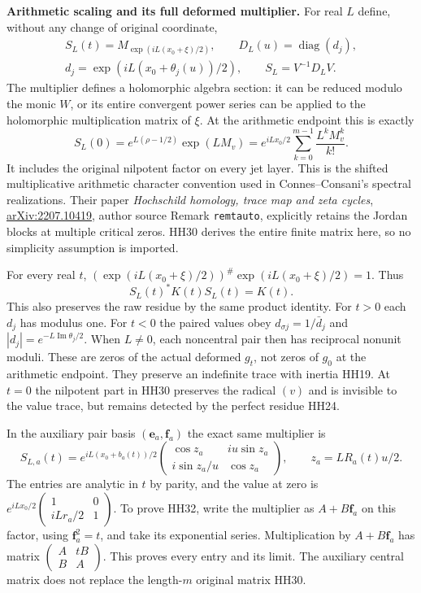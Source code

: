 \HH\textbf{Arithmetic scaling and its full deformed multiplier.}
For real $L$ define, without any change of original coordinate,
\[
 \begin{gathered}
 S_L(t)=M_{\exp(iL(x_0+\xi)/2)},\qquad
 D_L(u)=\operatorname{diag}(d_j),\\
 d_j=\exp(iL(x_0+\theta_j(u))/2),\qquad
 S_L=V^{-1}D_LV .
 \end{gathered}
 \tag{HH29}\label{hh:scaling}
\]
The multiplier defines a holomorphic algebra section: it can be
reduced modulo the monic $W$, or its entire convergent power series
can be applied to the holomorphic multiplication matrix of $\xi$.
At the arithmetic endpoint this is exactly
\[
 S_L(0)=e^{L(\rho-1/2)}\exp(LM_v)
  =e^{iLx_0/2}\sum_{k=0}^{m-1}\frac{L^kM_v^k}{k!}.
 \tag{HH30}\label{hh:arithmetic-scaling}
\]
It includes the original nilpotent factor on every jet layer.
This is the shifted multiplicative arithmetic character convention
used in Connes--Consani's spectral realizations. Their paper
\emph{Hochschild homology, trace map and zeta cycles},
\href{https://arxiv.org/abs/2207.10419}{arXiv:2207.10419},
author source Remark \texttt{remtauto}, explicitly retains the
Jordan blocks at multiple critical zeros. HH30 derives the entire
finite matrix here, so no simplicity assumption is imported.

For every real $t$, $(\exp(iL(x_0+\xi)/2))^\#
\exp(iL(x_0+\xi)/2)=1$. Thus
\[
 S_L(t)^*K(t)S_L(t)=K(t).
 \tag{HH31}\label{hh:scaling-isometry}
\]
This also preserves the raw residue by the same product identity.
For $t>0$ each $d_j$ has modulus one.
For $t<0$ the paired values obey
$d_{\sigma j}=1/\bar d_j$ and
$|d_j|=e^{-L\operatorname{Im}\theta_j/2}$.
When $L\ne0$, each noncentral pair then has reciprocal nonunit
moduli. These are zeros of the actual deformed $g_t$, not zeros of
$g_0$ at the arithmetic endpoint. They preserve an indefinite trace
with inertia HH19. At $t=0$ the nilpotent part in HH30 preserves the
radical $(v)$ and is invisible to the value trace, but remains
detected by the perfect residue HH24.

In the auxiliary pair basis $(\mathbf e_a,\mathbf f_a)$ the exact
same multiplier is
\[
 S_{L,a}(t)=e^{iL(x_0+b_a(t))/2}
 \begin{pmatrix}
  \cos z_a&i u\sin z_a\\
  i\sin z_a/u&\cos z_a
 \end{pmatrix},
 \qquad z_a=L R_a(t)u/2 .
 \tag{HH32}\label{hh:scaling-pair}
\]
The entries are analytic in $t$ by parity, and the value at zero is
$e^{iLx_0/2}\left(\begin{smallmatrix}1&0\\iLr_a/2&1\end{smallmatrix}\right)$.
To prove HH32, write the multiplier as $A+B\mathbf f_a$ on this
factor, using $\mathbf f_a^2=t$, and take its exponential series.
Multiplication by $A+B\mathbf f_a$ has matrix
$\left(\begin{smallmatrix}A&tB\\B&A\end{smallmatrix}\right)$.
This proves every entry and its limit. The auxiliary central matrix
does not replace the length-$m$ original matrix HH30.

